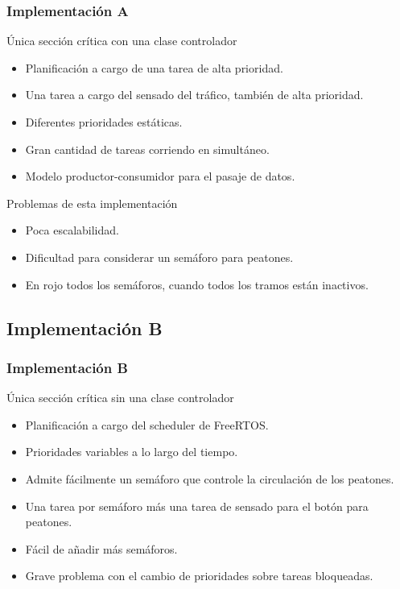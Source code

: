 \begin{frame}
\frametitle{Implementación A}
\begin{block}{Única sección crítica con una clase controlador}
	\begin{itemize}
		\item Planificación a cargo de una tarea de alta prioridad.
		\item Una tarea a cargo del sensado del tráfico, también de alta prioridad.
		\item Diferentes prioridades estáticas.
		\item Gran cantidad de tareas corriendo en simultáneo.
		\item Modelo productor-consumidor para el pasaje de datos.
	\end{itemize}
\end{block}
\begin{block}{Problemas de esta implementación}
	\begin{itemize}
		\item Poca escalabilidad.
		\item Dificultad para considerar un semáforo para peatones.
		\item En rojo todos los semáforos, cuando todos los tramos están inactivos.
	\end{itemize}
\end{block}
\end{frame}

\subsection{Implementación B}
\begin{frame}
\frametitle{Implementación B}
\begin{block}{Única sección crítica sin una clase controlador}
	\begin{itemize}
		\item Planificación a cargo del scheduler de FreeRTOS.
		\item Prioridades variables a lo largo del tiempo.
		\item Admite fácilmente un semáforo que controle la circulación de los peatones.
		\item Una tarea por semáforo más una tarea de sensado para el botón para peatones.
		\item Fácil de añadir más semáforos.
		\item Grave problema con el cambio de prioridades sobre tareas bloqueadas.
	\end{itemize}
\end{block}
\end{frame}

